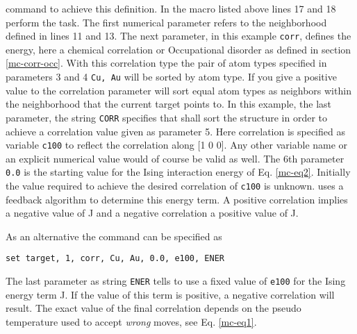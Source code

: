 command to achieve this definition. In the macro listed above lines 17 and 18 
perform the task. The first numerical parameter refers to the neighborhood 
defined in lines 11 and 13. The next parameter, in this example {\tt corr}, 
defines the energy, here a chemical correlation or Occupational disorder as 
defined in section \ref{mc-corr-occ}. With this correlation type the pair 
of atom types specified in parameters 3 and 4 {\tt Cu, Au} 
will be sorted by atom type. If you give a positive value to the correlation
parameter \Discus will sort equal atom types as neighbors within the 
neighborhood that the current target points to. In this example, the 
last parameter, the string {\tt CORR} specifies that \Discus shall sort the
structure in order to achieve a correlation value given as parameter 5. Here 
correlation is specified as variable {\tt c100} to reflect the correlation 
along [1 0 0]. Any other variable name or an explicit numerical value would
of course be valid as well. The 6th parameter {\tt 0.0} is the starting value
for the Ising interaction energy of Eq. \ref{mc-eq2}. Initially the value 
required to achieve the desired correlation of {\tt c100} is unknown. \Discus
uses a feedback algorithm to determine this energy term. A positive correlation
implies a negative value of J and a negative correlation a positive value of J.

As an alternative the command can be specified as 

{\tt set target, 1, corr, Cu, Au, 0.0, e100, ENER}

The last parameter as string {\tt ENER} tells \Discus to use a fixed value 
of {\tt e100} for the Ising energy term J. If the value of this term is positive,
a negative correlation will result. The exact value of the final correlation 
depends on the pseudo temperature used to accept {\it wrong} moves, see Eq. 
\ref{mc-eq1}.




